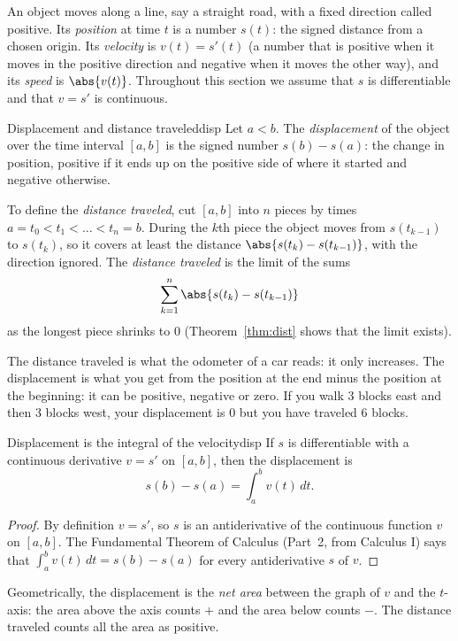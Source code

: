 \documentclass[11pt]{article}
\begin{document}
An object moves along a line, say a straight road, with a fixed direction called positive. Its \emph{position} at time $t$ is a number $s(t)$: the signed distance from a chosen origin. Its \emph{velocity} is $v(t)=s'(t)$ (a number that is positive when it moves in the positive direction and negative when it moves the other way), and its \emph{speed} is $\abs{v(t)}$. Throughout this section we assume that $s$ is differentiable and that $v=s'$ is continuous.

\begin{defn}{Displacement and distance traveled}{disp}
Let $a<b$. The \emph{displacement} of the object over the time interval $[a,b]$ is the signed number $s(b)-s(a)$: the change in position, positive if it ends up on the positive side of where it started and negative otherwise.

To define the \emph{distance traveled}, cut $[a,b]$ into $n$ pieces by times $a=t_0<t_1<\dots<t_n=b$. During the $k$th piece the object moves from $s(t_{k-1})$ to $s(t_k)$, so it covers at least the distance $\abs{s(t_k)-s(t_{k-1})}$, with the direction ignored. The \emph{distance traveled} is the limit of the sums
\[
\sum_{k=1}^n\abs{s(t_k)-s(t_{k-1})}
\]
as the longest piece shrinks to $0$ (Theorem~\ref{thm:dist} shows that the limit exists).
\end{defn}

The distance traveled is what the odometer of a car reads: it only increases. The displacement is what you get from the position at the end minus the position at the beginning: it can be positive, negative or zero. If you walk $3$ blocks east and then $3$ blocks west, your displacement is $0$ but you have traveled $6$ blocks.

\begin{thm}{Displacement is the integral of the velocity}{disp}
If $s$ is differentiable with a continuous derivative $v=s'$ on $[a,b]$, then the displacement is
\[
s(b)-s(a)=\int_a^bv(t)\,dt .
\]
\end{thm}
\begin{proof}
By definition $v=s'$, so $s$ is an antiderivative of the continuous function $v$ on $[a,b]$. The Fundamental Theorem of Calculus (Part~2, from Calculus I) says that $\int_a^bv(t)\,dt=s(b)-s(a)$ for every antiderivative $s$ of $v$.
\end{proof}

Geometrically, the displacement is the \emph{net area} between the graph of $v$ and the $t$-axis: the area above the axis counts $+$ and the area below counts $-$. The distance traveled counts all the area as positive.
\end{document}
